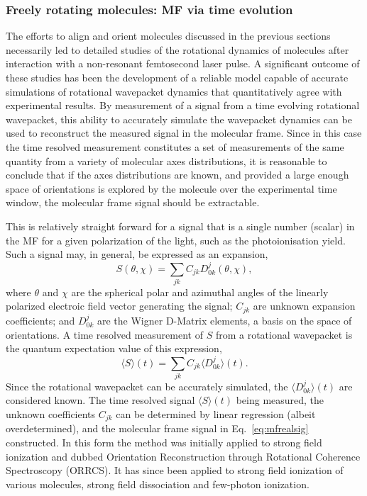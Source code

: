 \documentclass[10pt]{article}
\begin{document}
\subsubsection{Freely rotating molecules: MF via time evolution\label{sec:RWPs}}

The efforts to align and orient molecules discussed in the previous sections necessarily led to detailed studies of the rotational dynamics of molecules after interaction with a non-resonant femtosecond laser pulse. A significant outcome of these studies has been the development of a reliable model capable of accurate simulations of rotational wavepacket dynamics that quantitatively agree with experimental results. By measurement of a signal from a time evolving rotational wavepacket, this ability to accurately simulate the wavepacket dynamics can be used to reconstruct the measured signal in the molecular frame. Since in this case the time resolved measurement constitutes a set of measurements of the same quantity from a variety of molecular axes distributions, it is reasonable to conclude that if the axes distributions are known, and provided a large enough space of orientations is explored by the molecule over the experimental time window, the molecular frame signal should be extractable. 

This is relatively straight forward for a signal that is a single number (scalar) in the MF for a given polarization of the light, such as the photoionisation yield. Such a signal may, in general, be expressed as an expansion,
\begin{equation}
S(\theta,\chi)=\sum_{jk}C_{jk}D^{j}_{0k}(\theta,\chi),
\label{eq:mfrealsig}
\end{equation}
where $\theta$ and $\chi$ are the spherical polar and azimuthal angles of the linearly polarized electroic field vector generating the signal; $C_{jk}$ are unknown expansion coefficients; and $D^{j}_{0k}$ are the Wigner D-Matrix elements, a basis on the space of orientations. A time resolved measurement of $S$ from a rotational wavepacket is the quantum expectation value of this expression,
\begin{equation}
\langle S \rangle(t) = \sum_{jk}C_{jk}\langle D^{j}_{0k} \rangle (t).
\label{eq:St-Cjk}
\end{equation}
Since the rotational wavepacket can be accurately simulated, the $\langle D^{j}_{0k} \rangle (t)$ are considered known. The time resolved signal $\langle S \rangle(t)$ being measured, the unknown coefficients $C_{jk}$ can be determined by linear regression (albeit overdetermined), and the molecular frame signal in Eq.~\ref{eq:mfrealsig} constructed. In this form the method was initially applied to strong field ionization and dubbed Orientation Reconstruction through Rotational Coherence Spectroscopy (ORRCS). It has since been applied to strong field ionization of various molecules, strong field dissociation and few-photon ionization.
\end{document}
